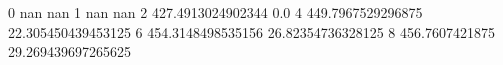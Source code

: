0 nan nan
1 nan nan
2 427.4913024902344 0.0
4 449.7967529296875 22.305450439453125
6 454.3148498535156 26.82354736328125
8 456.7607421875 29.269439697265625
